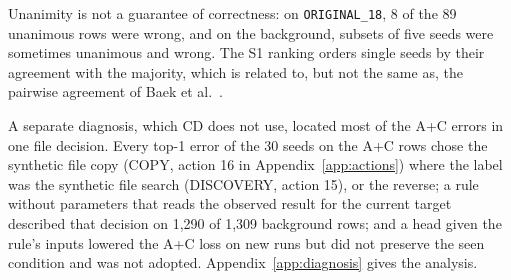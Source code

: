 Unanimity is not a guarantee of correctness: on
\texttt{ORIGINAL\_18}, 8 of the 89 unanimous rows were wrong, and on
the background, subsets of five seeds were sometimes unanimous and
wrong. The S1 ranking orders single seeds by their agreement with the
majority, which is related to, but not the same as, the pairwise
agreement of Baek et al.~\cite{baek2022agreement}.

A separate diagnosis, which CD does not use, located most of the A+C
errors in one file decision. Every top-1 error of the 30 seeds on the
A+C rows chose the synthetic file copy (COPY, action 16 in
Appendix~\ref{app:actions}) where the label was the synthetic file
search (DISCOVERY, action 15), or the reverse; a
rule without parameters that reads the observed result for the current
target described that decision on 1,290 of 1,309 background rows; and
a head given the rule's inputs lowered the A+C loss on new runs but did
not preserve the seen condition and was not adopted.
Appendix~\ref{app:diagnosis} gives the analysis.

